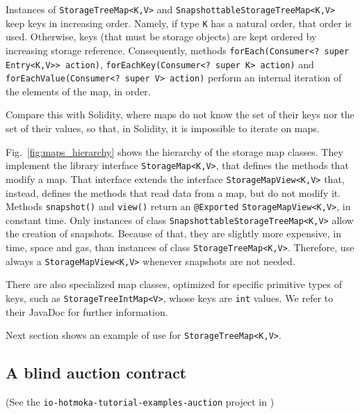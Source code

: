 Instances of \texttt{StorageTreeMap<K,V>} and \texttt{SnapshottableStorageTreeMap<K,V>}
keep keys in increasing order. Namely, if
type \texttt{K} has a natural order, that order is used. Otherwise, keys
(that must be storage objects) are kept ordered by increasing storage
reference. Consequently, methods \texttt{forEach(Consumer<? super Entry<K,V>{}> action)},
\texttt{forEachKey(Consumer<? super K> action)} and
\texttt{forEachValue(Consumer<? super V> action)}
perform an internal iteration of the elements of the map, in order.
%
\begin{commentbox}
Compare this with Solidity, where maps do not know the set of their keys nor the
set of their values, so that, in Solidity, it is impossible to iterate on maps.
\end{commentbox}

Fig.~\ref{fig:maps_hierarchy} shows the hierarchy of the storage map classes.
They implement the library interface \texttt{StorageMap<K,V>},
that defines the methods that modify a map.
That interface extends the interface \texttt{StorageMapView<K,V>}
that, instead, defines the methods that read data from a map, but do not modify it.
Methods \texttt{snapshot()}
and \texttt{view()} return an \texttt{@Exported}
\texttt{StorageMapView<K,V>}, in constant time.
Only instances of class \texttt{SnapshottableStorageTreeMap<K,V>} allow the creation of snapshots.
Because of that, they are slightly more expensive, in time, space and gas, than instances of
class \texttt{StorageTreeMap<K,V>}. Therefore, use always a \texttt{StorageMapView<K,V>} whenever
snapshots are not needed.

There are also specialized map classes, optimized
for specific primitive types of keys, such as
\texttt{StorageTreeIntMap<V>},
whose keys are \texttt{int} values. We refer to their JavaDoc for further information.

Next section shows an example of use for \texttt{StorageTreeMap<K,V>}.

\subsection{A blind auction contract}\label{subsec:blind_auction}

\begin{center}
(See the \texttt{io-hotmoka-tutorial-examples-auction} project in \hotmokaRepo{})
\end{center}


